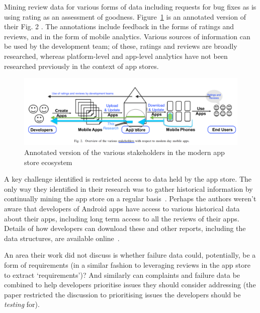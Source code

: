 Mining review data for various forms of data including requests for bug fixes as is using rating as an assessment of goodness. 
Figure~\ref{fig:nagappan2016_future_trends_in_sw_eng_for_mobile_apps_figure_2_annotated} is an annotated version of their Fig. 2 . The annotations include feedback in the forms of ratings and reviews, and in the form of mobile analytics. Various sources of information can be used by the development team; of these, ratings and reviews are broadly researched, whereas platform-level and app-level analytics have not been researched previously in the context of app stores.


\begin{figure}
    \centering
    \includegraphics[width=\linewidth]{images/related-work/future-trends-in-sweng-for-mobile-apps-fig-2-annotated-with-highlights.pdf}
    \caption[Various stakeholders in the modern app store ecosystem, adapted from~\cite{nagappan2016_future_trends_in_sw_eng_for_mobile_apps}]{Annotated version of the various stakeholders in the modern app store ecosystem~\cite{nagappan2016_future_trends_in_sw_eng_for_mobile_apps}}
    \label{fig:nagappan2016_future_trends_in_sw_eng_for_mobile_apps_figure_2_annotated}
\end{figure}
 

A key challenge identified is restricted access to data held by the app store. The only way they identified in their research was to gather historical information by continually mining the app store on a regular basis~. Perhaps the authors weren't aware that developers of Android apps have access to various historical data about their apps, including long term access to all the reviews of their apps. Details of how developers can download these and other reports, including the data structures, are available online~.

An area their work did not discuss is whether failure data could, potentially, be a form of requirements (in a similar fashion to leveraging reviews in the app store to extract `requirements')? And similarly can complaints and failure data be combined to help developers prioritise issues they should consider addressing (the paper restricted the discussion to prioritising issues the developers should be \emph{testing} for).

